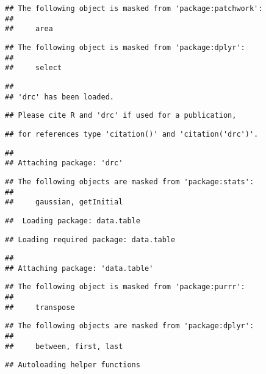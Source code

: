 \documentclass[
]{article}
\begin{document}
\begin{verbatim}
## The following object is masked from 'package:patchwork':
## 
##     area
\end{verbatim}

\begin{verbatim}
## The following object is masked from 'package:dplyr':
## 
##     select
\end{verbatim}

\begin{verbatim}
## 
## 'drc' has been loaded.
\end{verbatim}

\begin{verbatim}
## Please cite R and 'drc' if used for a publication,
\end{verbatim}

\begin{verbatim}
## for references type 'citation()' and 'citation('drc')'.
\end{verbatim}

\begin{verbatim}
## 
## Attaching package: 'drc'
\end{verbatim}

\begin{verbatim}
## The following objects are masked from 'package:stats':
## 
##     gaussian, getInitial
\end{verbatim}

\begin{verbatim}
##  Loading package: data.table
\end{verbatim}

\begin{verbatim}
## Loading required package: data.table
\end{verbatim}

\begin{verbatim}
## 
## Attaching package: 'data.table'
\end{verbatim}

\begin{verbatim}
## The following object is masked from 'package:purrr':
## 
##     transpose
\end{verbatim}

\begin{verbatim}
## The following objects are masked from 'package:dplyr':
## 
##     between, first, last
\end{verbatim}

\begin{verbatim}
## Autoloading helper functions
\end{verbatim}
\end{document}
